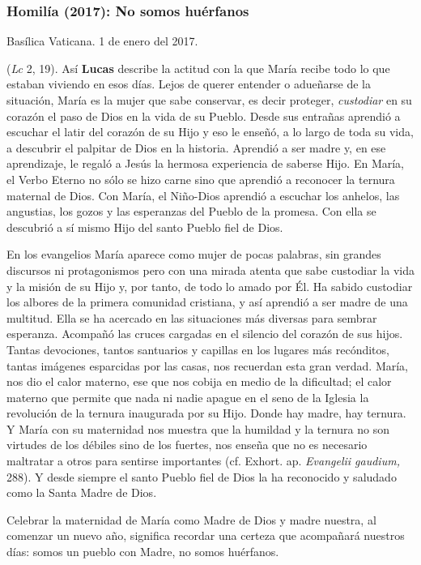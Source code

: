 \begin{body}
\begin{body}
\subsubsection{Homilía (2017): No somos huérfanos}

Basílica Vaticana. 1 de enero del 2017.

 (\emph{Lc} 2, 19). Así \textbf{Lucas} describe la actitud con la que María recibe todo lo que estaban viviendo en esos días. Lejos de querer entender o adueñarse de la situación, María es la mujer que sabe conservar, es decir proteger, \emph{custodiar} en su corazón el paso de Dios en la vida de su Pueblo. Desde sus entrañas aprendió a escuchar el latir del corazón de su Hijo y eso le enseñó, a lo largo de toda su vida, a descubrir el palpitar de Dios en la historia. Aprendió a ser madre y, en ese aprendizaje, le regaló a Jesús la hermosa experiencia de saberse Hijo. En María, el Verbo Eterno no sólo se hizo carne sino que aprendió a reconocer la ternura maternal de Dios. Con María, el Niño-Dios aprendió a escuchar los anhelos, las angustias, los gozos y las esperanzas del Pueblo de la promesa. Con ella se descubrió a sí mismo Hijo del santo Pueblo fiel de Dios.

En los evangelios María aparece como mujer de pocas palabras, sin grandes discursos ni protagonismos pero con una mirada atenta que sabe custodiar la vida y la misión de su Hijo y, por tanto, de todo lo amado por Él. Ha sabido custodiar los albores de la primera comunidad cristiana, y así aprendió a ser madre de una multitud. Ella se ha acercado en las situaciones más diversas para sembrar esperanza. Acompañó las cruces cargadas en el silencio del corazón de sus hijos. Tantas devociones, tantos santuarios y capillas en los lugares más recónditos, tantas imágenes esparcidas por las casas, nos recuerdan esta gran verdad. María, nos dio el calor materno, ese que nos cobija en medio de la dificultad; el calor materno que permite que nada ni nadie apague en el seno de la Iglesia la revolución de la ternura inaugurada por su Hijo. Donde hay madre, hay ternura. Y María con su maternidad nos muestra que la humildad y la ternura no son virtudes de los débiles sino de los fuertes, nos enseña que no es necesario maltratar a otros para sentirse importantes (cf. Exhort. ap. \emph{Evangelii gaudium,} 288). Y desde siempre el santo Pueblo fiel de Dios la ha reconocido y saludado como la Santa Madre de Dios.

Celebrar la maternidad de María como Madre de Dios y madre nuestra, al comenzar un nuevo año, significa recordar una certeza que acompañará nuestros días: somos un pueblo con Madre, no somos huérfanos.


\end{body}
\end{body}
